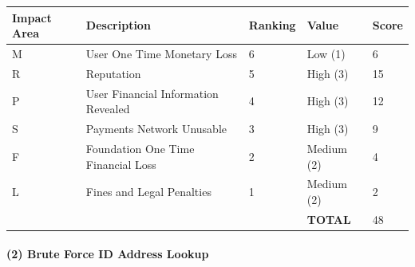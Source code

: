 \documentclass[12pt]{article} %
\begin{document}
{\begin{center}
\begin{tabular}{ | l | l | l | l | l |}
  \hline
  \textbf{Impact Area} & \textbf{Description} & \textbf{Ranking} & \textbf{Value} & \textbf{Score}
  \\ \hline
  M & User One Time Monetary Loss			& 6	& Low (1)		& 6
  \\ \hline
  R & Reputation		& 5	& High (3)		& 15
  \\ \hline
  P & User Financial Information Revealed		& 4	& High (3)		& 12
  \\ \hline
  S & Payments Network Unusable					& 3	& High (3)		& 9
  \\ \hline
  F & Foundation One Time Financial Loss	& 2	& Medium (2)	& 4
  \\ \hline
  L & Fines and Legal Penalties						& 1	& Medium (2)	& 2
  \\ \hline
  & & & \textbf{TOTAL} & 48
  \\ \hline
\end{tabular}
\end{center}
\label{tab:severityIdOrAmlDatabaseHacked}

\paragraph{(2) Brute Force ID Address Lookup }

}
\end{document}
